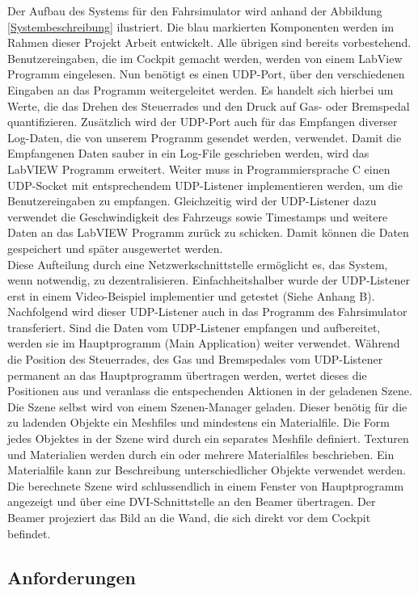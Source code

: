 Der Aufbau des Systems für den Fahrsimulator wird anhand der Abbildung \ref{Systembeschreibung} ilustriert. Die blau markierten Komponenten werden im Rahmen dieser Projekt Arbeit entwickelt. Alle übrigen sind bereits vorbestehend. 
Benutzereingaben, die im Cockpit gemacht werden, werden von einem LabView Programm eingelesen. Nun benötigt es einen UDP-Port,  über den verschiedenen Eingaben an das Programm weitergeleitet werden. Es handelt sich hierbei um Werte, die das Drehen des Steuerrades und den Druck auf Gas- oder Bremspedal quantifizieren. Zusätzlich wird der UDP-Port auch für das Empfangen diverser Log-Daten, die von unserem Programm gesendet werden, verwendet. Damit die Empfangenen Daten sauber in ein Log-File geschrieben werden, wird das LabVIEW Programm erweitert. 
Weiter  muss in Programmiersprache C einen UDP-Socket mit entsprechendem UDP-Listener implementieren werden, um die Benutzereingaben zu empfangen. Gleichzeitig wird der UDP-Listener dazu verwendet die Geschwindigkeit des Fahrzeugs sowie Timestamps und weitere Daten an das LabVIEW Programm zurück zu schicken. Damit können die Daten gespeichert und später ausgewertet werden.
\\
Diese Aufteilung durch eine Netzwerkschnittstelle ermöglicht es,  das System, wenn notwendig, zu dezentralisieren. Einfachheitshalber wurde der UDP-Listener erst in einem Video-Beispiel implementier und getestet (Siehe Anhang B). Nachfolgend wird dieser UDP-Listener auch in das Programm des Fahrsimulator transferiert.
Sind die Daten vom UDP-Listener empfangen und aufbereitet, werden sie im Hauptprogramm (Main Application) weiter verwendet. Während die Position des Steuerrades, des Gas und Bremspedales vom UDP-Listener permanent an das Hauptprogramm übertragen werden, wertet dieses die Positionen aus und veranlass die entspechenden Aktionen in der geladenen Szene. 
Die Szene selbst wird von einem Szenen-Manager geladen. Dieser benötig für die zu ladenden Objekte ein Meshfiles und mindestens ein Materialfile. Die Form jedes Objektes in der Szene wird durch ein separates Meshfile definiert. Texturen und Materialien werden durch ein oder mehrere Materialfiles beschrieben. Ein Materialfile kann zur Beschreibung unterschiedlicher Objekte verwendet werden. Die berechnete Szene wird schlussendlich in einem Fenster von Hauptprogramm angezeigt und über eine DVI-Schnittstelle an den Beamer übertragen. Der Beamer projeziert das Bild an die Wand, die sich direkt vor dem Cockpit befindet. 

\subsection{Anforderungen}
